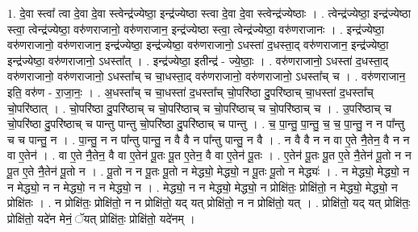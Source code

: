 \documentclass[17pt]{extarticle}
\begin{document}
1. दे॒वा स्त्वा᳚ त्वा दे॒वा दे॒वा स्त्वेन्द्र॑ज्येष्ठा॒ इन्द्र॑ज्येष्ठा स्त्वा दे॒वा दे॒वा स्त्वेन्द्र॑ज्येष्ठाः । . त्वेन्द्र॑ज्येष्ठा॒ इन्द्र॑ज्येष्ठा स्त्वा॒ त्वेन्द्र॑ज्येष्ठा॒ वरु॑णराजानो॒ वरु॑णराजान॒ इन्द्र॑ज्येष्ठा स्त्वा॒ त्वेन्द्र॑ज्येष्ठा॒ वरु॑णराजानः । . इन्द्र॑ज्येष्ठा॒ वरु॑णराजानो॒ वरु॑णराजान॒ इन्द्र॑ज्येष्ठा॒ इन्द्र॑ज्येष्ठा॒ वरु॑णराजानो॒ ऽधस्ता॑ द॒धस्ता॒द् वरु॑णराजान॒ इन्द्र॑ज्येष्ठा॒ इन्द्र॑ज्येष्ठा॒ वरु॑णराजानो॒ ऽधस्ता᳚त् । . इन्द्र॑ज्येष्ठा॒ इतीन्द्र॑ - ज्ये॒ष्ठाः॒ । . वरु॑णराजानो॒ ऽधस्ता॑ द॒धस्ता॒द् वरु॑णराजानो॒ वरु॑णराजानो॒ ऽधस्ता᳚च् च चा॒धस्ता॒द् वरु॑णराजानो॒ वरु॑णराजानो॒ ऽधस्ता᳚च् च । . वरु॑णराजान॒ इति॒ वरु॑ण - रा॒जा॒नः॒ । . अ॒धस्ता᳚च् च चा॒धस्ता॑ द॒धस्ता᳚च् चो॒परि॑ष्ठा दु॒परि॑ष्ठाच् चा॒धस्ता॑ द॒धस्ता᳚च् चो॒परि॑ष्ठात् । . चो॒परि॑ष्ठा दु॒परि॑ष्ठाच् च चो॒परि॑ष्ठाच् च चो॒परि॑ष्ठाच् च चो॒परि॑ष्ठाच् च । . उ॒परि॑ष्ठाच् च चो॒परि॑ष्ठा दु॒परि॑ष्ठाच् च पान्तु पान्तु चो॒परि॑ष्ठा दु॒परि॑ष्ठाच् च पान्तु । . च॒ पा॒न्तु॒ पा॒न्तु॒ च॒ च॒ पा॒न्तु॒ न न पा᳚न्तु च च पान्तु॒ न । . पा॒न्तु॒ न न पा᳚न्तु पान्तु॒ न वै वै न पा᳚न्तु पान्तु॒ न वै । . न वै वै न न वा ए॒ते नै॒तेन॒ वै न न वा ए॒तेन॑ । . वा ए॒ते नै॒तेन॒ वै वा ए॒तेन॑ पू॒तः पू॒त ए॒तेन॒ वै वा ए॒तेन॑ पू॒तः । . ए॒तेन॑ पू॒तः पू॒त ए॒ते नै॒तेन॑ पू॒तो न न पू॒त ए॒ते नै॒तेन॑ पू॒तो न । . पू॒तो न न पू॒तः पू॒तो न मेद्ध्यो॒ मेद्ध्यो॒ न पू॒तः पू॒तो न मेद्ध्यः॑ । . न मेद्ध्यो॒ मेद्ध्यो॒ न न मेद्ध्यो॒ न न मेद्ध्यो॒ न न मेद्ध्यो॒ न । . मेद्ध्यो॒ न न मेद्ध्यो॒ मेद्ध्यो॒ न प्रोक्षि॑तः॒ प्रोक्षि॑तो॒ न मेद्ध्यो॒ मेद्ध्यो॒ न प्रोक्षि॑तः । . न प्रोक्षि॑तः॒ प्रोक्षि॑तो॒ न न प्रोक्षि॑तो॒ यद् यत् प्रोक्षि॑तो॒ न न प्रोक्षि॑तो॒ यत् । . प्रोक्षि॑तो॒ यद् यत् प्रोक्षि॑तः॒ प्रोक्षि॑तो॒ यदे॑न मेनं॒ ॅयत् प्रोक्षि॑तः॒ प्रोक्षि॑तो॒ यदे॑नम् । \newline
\end{document}
